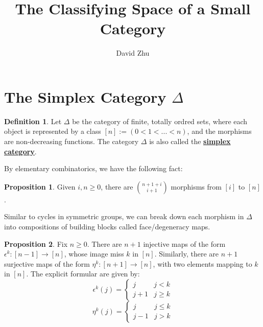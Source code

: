 \documentclass{article}
\title{The Classifying Space of a Small Category}
\author{David Zhu}
\theoremstyle{definition}
\theoremstyle{definition}
\newtheorem{definition}{Definition}[theorem]
\theoremstyle{definition}
\theoremstyle{definition}
\newtheorem{proposition}{Proposition}[theorem]
\theoremstyle{definition}
\theoremstyle{definition}
\theoremstyle{definition}
\begin{document}
\maketitle

\section{The Simplex Category $\Delta$}


\begin{tcolorbox}[colback=purple!5!white,colframe=purple!75!black]
\begin{definition}
    Let $\Delta$ be the category of finite, totally ordred sets, where each object is represented by a class $[n]:=(0<1<...<n)$, and the morphisms are non-decreasing functions. The category $\Delta$ is also called the \underline{\textbf{simplex category}}.
    
\end{definition}
\end{tcolorbox}

By elementary combinatorics, we have the following fact:
\begin{tcolorbox}[colback=blue!5!white,colframe=blue!30!white]
\begin{proposition}
   Given $i,n\geq 0$, there are $\binom{n+1+i}{i+1}$ morphisms from $[i]$ to $[n]$. 
\end{proposition}
\end{tcolorbox}


Similar to cycles in symmetric groups, we can break down each morphism in $\Delta$ into compositions of building blocks called face/degeneracy maps.


\begin{tcolorbox}[colback=blue!5!white,colframe=blue!30!white]
\begin{proposition}
    Fix $n\geq 0$. There are $n+1$ injective maps of the form $\epsilon^k:[n-1]\to [n]$,  whose image miss $k$ in $[n]$. Similarly, there are  $n+1$ surjective maps of the form $\eta^k:[n+1]\to [n]$, with two elements mapping to $k$ in $[n]$. The explicit formular are given by:
    \[
    \epsilon^k(j)=
    \begin{cases}
        j & j< k\\
        j+1 & j\geq k
    \end{cases}\]
    \[
    \eta^k(j)=
    \begin{cases}
        j & j\leq k\\
        j-1 & j> k
    \end{cases}\]
    
    
\end{proposition}
\end{tcolorbox}
\end{document}
